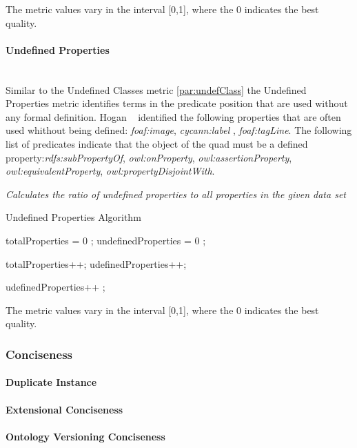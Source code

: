 The metric values vary in the interval [0,1], where  the 0 indicates the best quality.


\paragraph{Undefined  Properties}  ~\\ 


Similar to the Undefined Classes metric \ref{par:undefClass} the Undefined Properties metric identifies terms in the predicate position that are used without any formal definition.
 Hogan  ~\cite{hogan2010} identified the following properties that are often used whithout being defined:  \textit{foaf:image}, \textit{cycann:label} , \textit{foaf:tagLine}.
The following list of predicates indicate that the object of the quad must be a defined property:\textit{rdfs:subPropertyOf}, \textit{owl:onProperty}, \textit{owl:assertionProperty}, \textit{owl:equivalentProperty}, \textit{owl:propertyDisjointWith}.

\begin{mdframed}[style=metricdefinition]
\emph{Calculates the ratio of undefined properties to all properties in the given data set}
\end{mdframed}

\begin{algorithm}
\caption{Undefined Properties Algorithm}
\begin{algorithmic}[1]
\State totalProperties = 0 ;
\State undefinedProperties = 0 ;
\EndProcedure

 totalProperties++; \EndIf 
{} udefinedProperties++; \EndIf

 udefinedProperties++ ; \EndIf
{}
\EndProcedure
\end{algorithmic}
\end{algorithm}

The metric values vary in the interval [0,1], where  the 0 indicates the best quality.


\subsubsection{Conciseness}

\paragraph{Duplicate Instance}

\paragraph{Extensional Conciseness}

\paragraph{Ontology Versioning Conciseness}



